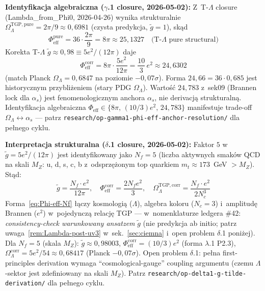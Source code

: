 \medskip\noindent
\textbf{Identyfikacja algebraiczna ($\gamma$.1 closure, 2026-05-02):}
Z~T-$\Lambda$ closure (Lambda\_from\_Phi0, 2026-04-26) wynika strukturalnie
$\Omega_\Lambda^{\mathrm{TGP,pure}} = 2\pi/9 \approx 0{,}6981$
(czysta predykcja, $\tilde{g} = 1$), sk\k{a}d
\begin{equation}
\Phi_{\mathrm{eff}}^{\mathrm{pure}} = 36 \cdot \frac{2\pi}{9} = 8\pi \approx 25{,}1327
\quad\text{(T-}\Lambda\text{ pure structural)} \label{eq:Phi-eff-pure}
\end{equation}
Korekta T-$\Lambda$ $\tilde{g} \approx 0{,}98 \equiv 5e^2/(12\pi)$ daje
\begin{equation}
\Phi_{\mathrm{eff}}^{\mathrm{corr}} = 8\pi \cdot \frac{5e^2}{12\pi}
= \frac{10}{3}\,e^2 \approx 24{,}6302 \label{eq:Phi-eff-corr}
\end{equation}
(match Planck $\Omega_\Lambda = 0{,}6847$ na poziomie $-0{,}07\sigma$).
Forma $24{,}66 = 36 \cdot 0{,}685$ jest historycznym przybli\.zeniem
(stary PDG $\Omega_\Lambda$). Warto\'s\'c $24{,}783$ z~sek09
(Brannen lock dla $\alpha_s$) jest fenomenologicznym anchora $\alpha_s$,
nie derivacj\k{a} strukturaln\k{a}.
Identyfikacja algebraiczna $\Phi_{\mathrm{eff}} \in \{8\pi,\,(10/3)e^2,\,24{,}783\}$
manifestuje trade-off $\Omega_\Lambda \leftrightarrow \alpha_s$ ---
patrz \texttt{research/op-gamma1-phi-eff-anchor-resolution/} dla pe\l{}nego cyklu.

\medskip\noindent
\textbf{Interpretacja strukturalna ($\delta$.1 closure, 2026-05-02):}
Faktor $5$ w~$\tilde{g} = 5e^2/(12\pi)$ jest identyfikowany jako
$N_f = 5$ (liczba aktywnych smak\'ow QCD na skali $M_Z$:
u, d, s, c, b z~odsprz\k{e}\.zonym top quarkiem $m_t \approx 173$~GeV $> M_Z$).
St\k{a}d:
\begin{equation}
\tilde{g} = \frac{N_f \cdot e^2}{12\pi}, \quad
\Phi_{\mathrm{eff}}^{\mathrm{corr}} = \frac{2 N_f e^2}{3}, \quad
\Omega_\Lambda^{\mathrm{TGP,corr}} = \frac{N_f \cdot e^2}{2 N_c^3}
\label{eq:Phi-eff-Nf}
\end{equation}
Forma~\eqref{eq:Phi-eff-Nf} \l{}\k{a}czy kosmologi\k{a} ($\Lambda$),
algebra koloru ($N_c = 3$) i~amplitud\k{e} Brannen ($e^2$) w~pojedyncz\k{a}
relacj\k{e} TGP --- w~nomenklaturze ledgera \#42:
\emph{consistency-check warunkowany ansatzem} $\tilde{g}$
(nie predykcja ab initio; patrz uwaga~\ref{rem:Lambda-post-uv3}
w~sek.~\ref{sec:ciemna} i~open problem $\delta$.1 poni\.zej). Dla $N_f = 5$ (skala $M_Z$): $\tilde{g} \approx 0{,}98003$,
$\Phi_{\mathrm{eff}}^{\mathrm{corr}} = (10/3)e^2$ (forma $\lambda$.1 P2.3),
$\Omega_\Lambda^{\mathrm{corr}} = 5e^2/54 \approx 0{,}68417$ (Planck $-0{,}07\sigma$).
\textsf{Open problem $\delta$.1: pe\l{}na first-principles derivation wymaga
``cosmological-gauge'' coupling argumentu (czemu $\Lambda$-sektor jest
zdefiniowany na skali $M_Z$). Patrz
\texttt{research/op-delta1-g-tilde-derivation/} dla pe\l{}nego cyklu.}

